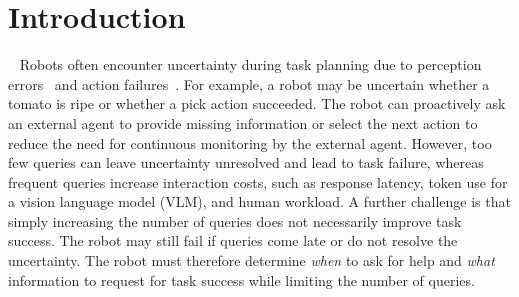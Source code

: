 \section{Introduction}~\label{intro}
Robots often encounter uncertainty during task planning due to perception errors~\citep{kaipa2016addressing} and action failures~\citep{kaelbling1998planning}. For example, a robot may be uncertain whether a tomato is ripe or whether a pick action succeeded. The robot can proactively ask an external agent to provide missing information or select the next action to reduce the need for continuous monitoring by the external agent. However, too few queries can leave uncertainty unresolved and lead to task failure, whereas frequent queries increase interaction costs, such as response latency, token use for a vision language model (VLM), and human workload. A further challenge is that simply increasing the number of queries does not necessarily improve task success. The robot may still fail if queries come late or do not resolve the uncertainty. The robot must therefore determine \textit{when} to ask for help and \textit{what} information to request for task success while limiting the number of queries.

